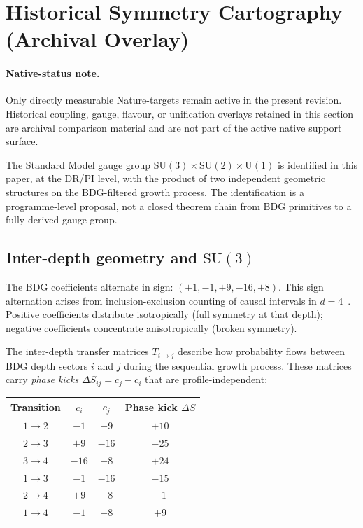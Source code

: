 \documentclass[11pt]{article}
\begin{document}
\section{Historical Symmetry Cartography (Archival Overlay)}

\paragraph{Native-status note.} Only directly measurable Nature-targets remain active in the present revision. Historical coupling, gauge, flavour, or unification overlays retained in this section are archival comparison material and are not part of the active native support surface.
\label{sec:gauge}

The Standard Model gauge group $\mathrm{SU}(3)\times\mathrm{SU}(2)\times\mathrm{U}(1)$ is identified in this paper, at the DR/PI level, with the product of two independent geometric structures on the BDG-filtered growth process. The identification is a programme-level proposal, not a closed theorem chain from BDG primitives to a fully derived gauge group.

\subsection{Inter-depth geometry and $\mathrm{SU}(3)$}

The BDG coefficients alternate in sign: $(+1,-1,+9,-16,+8)$. This sign alternation arises from inclusion-exclusion counting of causal intervals in $d=4$~\cite{Benincasa2010}. Positive coefficients distribute isotropically (full symmetry at that depth); negative coefficients concentrate anisotropically (broken symmetry).

The inter-depth transfer matrices $T_{i\to j}$ describe how probability flows between BDG depth sectors $i$ and $j$ during the sequential growth process. These matrices carry \emph{phase kicks} $\Delta S_{ij}=c_j-c_i$ that are profile-independent:

\begin{center}
\begin{tabular}{cccc}
\toprule
Transition & $c_i$ & $c_j$ & Phase kick $\Delta S$ \\
\midrule
$1\to 2$ & $-1$ & $+9$ & $+10$ \\
$2\to 3$ & $+9$ & $-16$ & $-25$ \\
$3\to 4$ & $-16$ & $+8$ & $+24$ \\
$1\to 3$ & $-1$ & $-16$ & $-15$ \\
$2\to 4$ & $+9$ & $+8$ & $-1$ \\
$1\to 4$ & $-1$ & $+8$ & $+9$ \\
\bottomrule
\end{tabular}
\end{center}
\end{document}
